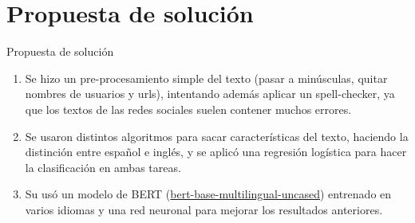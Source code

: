 \documentclass[10pt]{beamer}
\begin{document}
\section{Propuesta de solución}
\begin{frame}{Propuesta de solución}
\justify	
\small
\begin{enumerate}
\item Se hizo un pre-procesamiento simple del texto (pasar a minúsculas, quitar nombres de usuarios y urls), intentando además aplicar un spell-checker, ya que los textos de las redes sociales suelen contener muchos errores.

\item Se usaron distintos algoritmos para sacar características del texto, haciendo la distinción entre español e inglés, y se aplicó una regresión logística para hacer la clasificación en ambas tareas.

\item Su usó un modelo de BERT (\href{https://huggingface.co/bert-base-multilingual-uncased}{bert-base-multilingual-uncased}) entrenado en varios idiomas y una red neuronal para mejorar los resultados anteriores.
 
\end{enumerate}

\end{frame}
\end{document}
